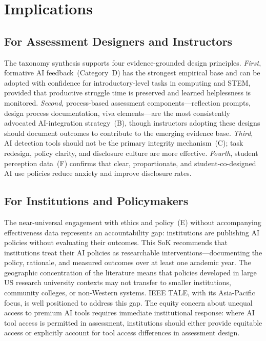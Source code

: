 \documentclass[conference]{IEEEtran}
\begin{document}
\section{Implications}
\label{sec:implications}

\subsection{For Assessment Designers and Instructors}

The taxonomy synthesis supports four evidence-grounded design principles.
\textit{First}, formative AI feedback~(Category~D) has the strongest empirical base and can be
adopted with confidence for introductory-level tasks in computing and STEM, provided that
productive struggle time is preserved and learned helplessness is monitored.
\textit{Second}, process-based assessment components---reflection prompts, design process
documentation, viva elements---are the most consistently advocated AI-integration strategy~(B),
though instructors adopting these designs should document outcomes to contribute to the emerging
evidence base.
\textit{Third}, AI detection tools should not be the primary integrity mechanism~(C); task
redesign, policy clarity, and disclosure culture are more effective.
\textit{Fourth}, student perception data~(F) confirms that clear, proportionate, and
student-co-designed AI use policies reduce anxiety and improve disclosure rates.

\subsection{For Institutions and Policymakers}

The near-universal engagement with ethics and policy~(E) without accompanying effectiveness data
represents an accountability gap: institutions are publishing AI policies without evaluating their
outcomes. This SoK recommends that institutions treat their AI policies as researchable
interventions---documenting the policy, rationale, and measured outcomes over at least one academic
year. The geographic concentration of the literature means that policies developed in large US
research university contexts may not transfer to smaller institutions, community colleges, or
non-Western systems. IEEE TALE, with its Asia-Pacific focus, is well positioned to address this
gap. The equity concern about unequal access to premium AI tools requires immediate institutional
response: where AI tool access is permitted in assessment, institutions should either provide
equitable access or explicitly account for tool access differences in assessment design.
\end{document}

